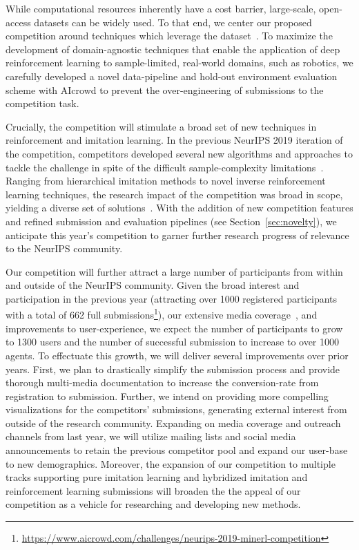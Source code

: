 While computational resources inherently have a cost barrier, large-scale, open-access datasets can be widely used. 
    To that end, we center our proposed competition around techniques which leverage the \minenet{} dataset~\cite{gussminerlijcai2019}.
    To maximize the development of domain-agnostic techniques that enable the application of deep reinforcement learning to sample-limited, real-world domains, such as robotics, we carefully developed a novel data-pipeline and hold-out environment evaluation scheme with AIcrowd to prevent the over-engineering of submissions to the competition task.

Crucially, the competition will stimulate a broad set of new techniques in reinforcement and imitation learning. 
    In the previous NeurIPS 2019 iteration of the competition, competitors developed several new algorithms and approaches to tackle the challenge in spite of the difficult sample-complexity limitations~\cite{gussminerlneurips2019}.
        Ranging from hierarchical imitation methods to novel inverse reinforcement learning techniques, the research impact of the competition was broad in scope, yielding a diverse set of solutions~\cite{milani2020minerl}. 
    With the addition of new competition features and refined submission and evaluation pipelines (see Section~\ref{sec:novelty}),
    we anticipate this year's competition to garner further research progress of relevance to the NeurIPS community.

Our competition will further attract a large number of participants from within and outside of the NeurIPS community. 
    Given the broad interest and participation in the previous year (attracting over 1000 registered participants with a total of 662 full submissions\footnote{\url{https://www.aicrowd.com/challenges/neurips-2019-minerl-competition}}), our extensive media coverage~\cite{hsu_2019,shead_2019,synced_2019,vincent_2019}, and improvements to user-experience, we expect the number of participants to grow to 1300 users and the number of successful submission to increase to over 1000 agents. To effectuate this growth, we will deliver several improvements over prior years. First, we plan to drastically simplify the submission process and provide thorough multi-media documentation to increase the conversion-rate from registration to submission. Further, we intend on providing more compelling visualizations for the competitors' submissions, generating external interest from outside of the research community. Expanding on media coverage and outreach channels from last year, we will utilize mailing lists and social media announcements to retain the previous competitor pool and expand our user-base to new demographics.
        Moreover, the expansion of our competition to multiple tracks supporting pure imitation learning and hybridized imitation and reinforcement learning submissions will broaden the the appeal of our competition as a vehicle for researching and developing new methods.



